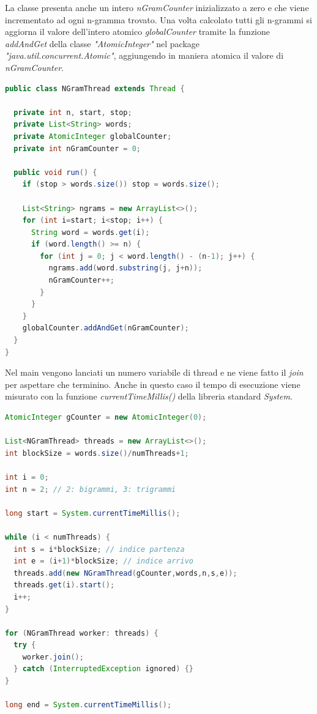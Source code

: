 \documentclass[10pt,twocolumn,letterpaper]{article}
\begin{document}
La classe presenta anche un intero \textit{nGramCounter} inizializzato a zero e che viene incrementato ad ogni n-gramma trovato. Una volta calcolato tutti gli n-grammi si aggiorna il valore dell'intero atomico \textit{globalCounter} tramite la funzione \textit{addAndGet} della classe \textit{"AtomicInteger"} nel package \textit{"java.util.concurrent.Atomic"}, aggiungendo in maniera atomica il valore di \textit{nGramCounter}.

\begin{lstlisting}[basicstyle=\scriptsize, language=Java, frame=single, caption={Esempio di ricerca di bigrammi/trigrammi con Java Thread},captionpos=b]
public class NGramThread extends Thread {

  private int n, start, stop;
  private List<String> words;
  private AtomicInteger globalCounter;
  private int nGramCounter = 0;

  public void run() {
    if (stop > words.size()) stop = words.size();

    List<String> ngrams = new ArrayList<>();
    for (int i=start; i<stop; i++) {
      String word = words.get(i);
      if (word.length() >= n) {
        for (int j = 0; j < word.length() - (n-1); j++) {
          ngrams.add(word.substring(j, j+n));
          nGramCounter++;
        }
      }
    }
    globalCounter.addAndGet(nGramCounter);
  }
}
\end{lstlisting}
Nel main vengono lanciati un numero variabile di thread e ne viene fatto il \textit{join} per aspettare che terminino.\newline
Anche in questo caso il tempo di esecuzione viene misurato con la funzione \textit{currentTimeMillis()} della libreria standard \textit{System}.

\begin{lstlisting}[basicstyle=\scriptsize, language=Java, frame=single, caption={Lancio di Java Thread per ricerca di bigrammi/trigrammi},captionpos=b]
AtomicInteger gCounter = new AtomicInteger(0);

List<NGramThread> threads = new ArrayList<>();
int blockSize = words.size()/numThreads+1;

int i = 0;
int n = 2; // 2: bigrammi, 3: trigrammi

long start = System.currentTimeMillis();

while (i < numThreads) {
  int s = i*blockSize; // indice partenza
  int e = (i+1)*blockSize; // indice arrivo
  threads.add(new NGramThread(gCounter,words,n,s,e));
  threads.get(i).start();
  i++;
}

for (NGramThread worker: threads) {
  try {
    worker.join();
  } catch (InterruptedException ignored) {}
}

long end = System.currentTimeMillis();
\end{lstlisting}
\end{document}

